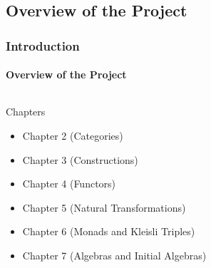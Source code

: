 \documentclass{beamer}
\begin{document}

\subsection[Overview]{Overview of the Project}


\begin{frame}[label={overview}]
  \frametitle{Introduction}
  \framesubtitle{Overview of the Project}

  \begin{columns}[onlytextwidth,c]
    \begin{column}{.8\textwidth}
      \begin{block}{Chapters}
        \begin{itemize}
        \item Chapter 2 (Categories)
        \item Chapter 3 (Constructions)
        \item Chapter 4 (Functors)
        \item Chapter 5 (Natural Transformations)
        \item Chapter 6 (Monads and Kleisli Triples)
        \item Chapter 7 (Algebras and Initial Algebras)
        \end{itemize}
      \end{block}
    \end{column}
    \begin{column}{.2\textwidth}
      \begin{center}
      \end{center}
    \end{column}
  \end{columns}

\end{frame}
\end{document}

